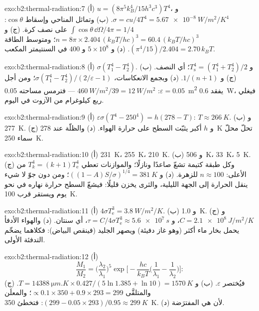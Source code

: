 \begin{solution}{exo:b2:thermal-radiation:7}
(أ) $u = (8\pi^5k_B^4/15h^3c^3)T^4$، و $\sigma = cu/4T^4 = \qty{5.67e-8}{W/m^2/K^4}$.
(ب) وتماثل المناحي وإسقاط $\cos\theta$: $\int\cos\theta\,\dd\Omega/4\pi = 1/4$
على نصف كرة. (ج) و $n = 8\pi \times 2.404\,(k_BT/hc)^3 = 60.4\,(k_BT/hc)^3$؛
ومتوسط الطاقة $(\pi^4/15)/2.404 = 2.70\,k_BT$. (د) و $5 \times 10^8$ و $400$
في السنتيمتر المكعب.
\end{solution}

\begin{solution}{exo:b2:thermal-radiation:8}
(أ) $\sigma(T_1^4 - T_2^4)$. (ب) و $T_{\text{s}}^4 = (T_1^4 + T_2^4)/2$؛ أي النصف. (ج)
و $1/(n + 1)$. (د) وبجمع الانعكاسات، $\sigma(T_1^4 - T_2^4)/(2/\varepsilon -
1)$؛ ومن أجل $\varepsilon = 0.05$: $\qty{460}{W/m^2}/39 = \qty{12}{W/m^2}$ --- فترمس
مساحته \qty{0.05}{m^2} يفقد \qty{0.6}{W}، فيغلي ربع كيلوغرام من
الآزوت في اليوم.
\end{solution}

\begin{solution}{exo:b2:thermal-radiation:9}
(أ) $\varepsilon\sigma(T^4 - 250^4) = h(278 - T)$: $T \approx \qty{266}{K}$. (ب)
و \qty{277}{K}. (ج) و $h$ أكبر يثبّت السطح على حرارة الهواء. (د) والظلّة
عند \qty{278}{K} تحلّ محلّ سماء \qty{250}{K}.
\end{solution}

\begin{solution}{exo:b2:thermal-radiation:10}
(أ) \qty{231}{K}، \qty{255}{K}، \qty{210}{K}. (ب) و \qty{506}{K}، \qty{33}{K}، \qty{5}{K}.
(ج) وكل طبقة كتيمة تشعّ صاعدًا ونازلًا؛ والموازنات تعطي
$T_k^4 = (k + 1)T_{\text{e}}^4$ من الأعلى: $n \approx 100$ للزهرة. (د)
و $((1 - A)S/\sigma)^{1/4} = \qty{381}{K}$؛ ومن دون جوّ لا شيء ينقل
الحرارة إلى الجهة الليلية، والثرى يخزن قليلًا: فيشعّ السطح
حرارة نهاره في نحو يوم ويستقر قرب
\qty{100}{K}.
\end{solution}

\begin{solution}{exo:b2:thermal-radiation:11}
(أ) $4\sigma T_{\text{e}}^3 = \qty{3.8}{W/m^2/K}$. (ب) و \qty{1.0}{K}. (ج) و $C =
\qty{2.1e8}{J/m^2/K}$، و $\tau = C/4\sigma T_{\text{e}}^3 \approx \qty{5.6e7}{s}$، أي سنتان.
(د) والهواء الأدفأ يحمل بخار ماء أكثر (وهو غاز دفيئة) ويصهر
الجليد (فينقص البياض): فكلاهما يضخّم التدفئة الأولى.
\end{solution}

\begin{solution}{exo:b2:thermal-radiation:12}
(أ)
\[
\frac{M_1}{M_2} = \Big(\frac{\lambda_2}{\lambda_1}\Big)^5\exp\Big[-\frac{hc}{k_BT}\Big(\frac{1}{\lambda_1} - \frac{1}{\lambda_2}\Big)\Big] :
\]
فيُختصر $\varepsilon$. (ب) و $T = \qty{14388}{\micro m.K} \times 0.427/(5\ln 1.385 +
\ln 10) = \qty{1570}{K}$. (ج) والمتلقَّى $\propto 0.1 \times 350 + 0.9 \times 293 =
299$؛ والمعلَن $(299 - 0.05 \times 293)/0.95 \approx \qty{299}{K}$: فتخطئ
\qty{350}{K}. (د) لأن  هي المفترَضة.
\end{solution}

